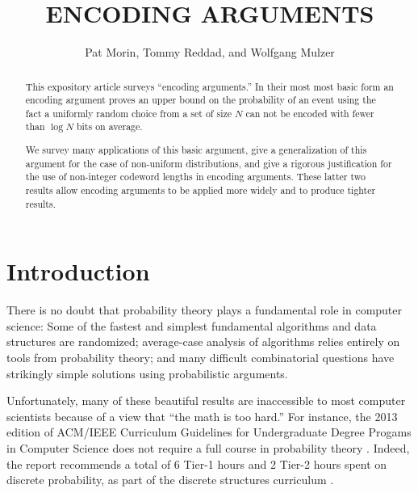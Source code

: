 \documentclass{patmorin}
\title{\MakeUppercase{Encoding Arguments}}
\author{Pat Morin, Tommy Reddad, and Wolfgang Mulzer}
\date{}
\begin{document}
\begin{titlepage}
\maketitle


\begin{abstract}
\setlength{\baselineskip}{15.84pt}
This expository article surveys ``encoding arguments.'' In their most most
basic form an encoding argument proves an upper bound on the probability
of an event using the fact a uniformly random choice from a set of size
$N$ can not be encoded with fewer than $\log N$ bits on average.

We survey many applications of this basic argument, give a generalization
of this argument for the case of non-uniform distributions, and give a
rigorous justification for the use of non-integer codeword lengths in
encoding arguments.  These latter two results allow encoding arguments to be applied more widely and to produce tighter results.
\end{abstract}


\end{titlepage}
\tableofcontents
\newpage
{}

\section{Introduction}
\setlength{\baselineskip}{15.84pt}
There is no doubt that probability theory plays a fundamental role
in computer science: Some of the fastest and simplest fundamental
algorithms and data structures are randomized; average-case analysis of
algorithms relies entirely on tools from probability theory; and many
difficult combinatorial questions have strikingly simple solutions using
probabilistic arguments.

Unfortunately, many of these beautiful results are inaccessible
to most computer scientists because of a view that ``the math
is too hard.''  For instance, the 2013 edition of ACM/IEEE
Curriculum Guidelines for Undergraduate Degree Progams in Computer
Science does not require a full course in probability theory
\cite[Page~50]{computing-curricula:computer}. Indeed, the report
recommends a total of 6 Tier-1 hours and 2 Tier-2 hours spent on
discrete probability, as part of the discrete structures curriculum
\cite[Page~77]{computing-curricula:computer}.
\end{document}
